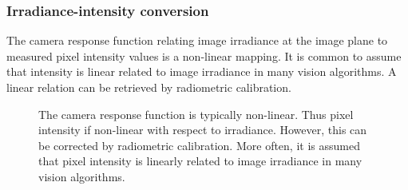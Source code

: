 \subsubsection{Irradiance-intensity conversion}
The camera response function relating image irradiance at the image plane to measured pixel intensity values is a non-linear mapping. It is common to assume that intensity is linear related to image irradiance in many vision algorithms. A linear relation can be retrieved by radiometric calibration.
\begin{figure}[!htbp]
\centering
{}
\caption{The camera response function is typically non-linear. Thus pixel intensity if non-linear with respect to irradiance. However, this can be corrected by radiometric calibration. More often, it is assumed that pixel intensity is linearly related to image irradiance in many vision algorithms.}
\label{fig:light_sensor_interact}
\end{figure}

